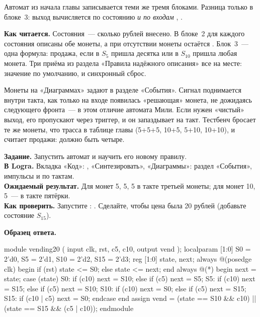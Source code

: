 Автомат из начала главы записывается теми же тремя блоками. Разница только
в блоке~3: выход  вычисляется по состоянию \emph{и по входам}
, .


\textbf{Как читается.} Состояния~--- сколько рублей внесено. В блоке~2 для
каждого состояния описаны обе монеты, а при отсутствии монеты остаётся
. Блок~3~--- одна формула: продажа, если в $S_5$ пришла
десятка или в $S_{10}$ пришла любая монета. Три приёма из раздела «Правила
надёжного описания» все на месте: значение по умолчанию,  и
синхронный сброс.


Монеты на «Диаграммах» задают в разделе «События». Сигнал 
поднимается внутри такта, как только на входе появилась «решающая» монета, не
дожидаясь следующего фронта~--- в этом отличие автомата Мили. Если нужен
«чистый» выход, его пропускают через триггер, и он запаздывает на такт.
Тестбенч  бросает те же монеты, что трасса в
таблице главы (5+5+5, 10+5, 5+10, 10+10), и считает продажи: должно быть четыре.

\begin{diybox}
\textbf{Задание.} Запустить автомат и научить его новому правилу.\\
\textbf{В Logra.} Вкладка «Код»: , «Синтезировать», «Диаграммы»:
раздел «События», импульсы  и  по тактам.\\
\textbf{Ожидаемый результат.} Для монет 5, 5, 5  в такте третьей
монеты; для монет 10, 5~--- в такте пятёрки.\\
\textbf{Как проверить.} Запустите : .
 Сделайте, чтобы цена была 20 рублей (добавьте состояние $S_{15}$).
\end{diybox}

\textbf{Образец ответа.}
\begin{vcode}
module vending20 (
    input  clk, rst, c5, c10,
    output vend
);
    localparam [1:0] S0 = 2'd0, S5 = 2'd1, S10 = 2'd2, S15 = 2'd3;
    reg [1:0] state, next;
    always @(posedge clk) begin
        if (rst) state <= S0;
        else     state <= next;
    end
    always @(*) begin
        next = state;
        case (state)
            S0:  if (c10) next = S10; else if (c5) next = S5;
            S5:  if (c10) next = S15; else if (c5) next = S10;
            S10: if (c10) next = S0;  else if (c5) next = S15;
            S15: if (c10 | c5) next = S0;
        endcase
    end
    assign vend = (state == S10 && c10) || (state == S15 && (c5 | c10));
endmodule
\end{vcode}


